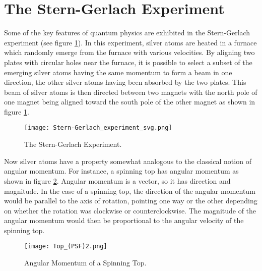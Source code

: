 \documentclass[letter, 12pt]{turabian-thesis}
\theoremstyle{hypothesis}
\begin{document}
\section{The Stern-Gerlach Experiment}
 Some of the key features of quantum physics are exhibited in the Stern-Gerlach experiment (see figure \ref{stern}).
In this experiment, silver atoms are heated in a furnace which randomly emerge from the furnace with various velocities. By aligning two plates with circular holes near the furnace, it is possible to select a subset of the emerging silver atoms having the same momentum to form a beam in one direction, the other silver atoms having been absorbed by the two plates. This beam of silver atoms is then directed between two magnets with the north pole of one magnet being aligned toward the south pole of the other magnet as shown in figure \ref{stern}.
\begin{figure}[ht!]
\captionsetup{justification=justified}
\centering
\texttt{[image: Stern-Gerlach\_experiment\_svg.png]}
\caption[Caption for LOF]{The Stern-Gerlach Experiment.\protect\footnotemark}
\label{stern}
\end{figure}
 Now silver atoms have a property somewhat analogous to the classical notion of angular momentum. For instance, a spinning top has angular momentum as shown in figure \ref{spintop}. Angular momentum is a vector, so it has direction and magnitude. In the case of a spinning top, the direction of the angular momentum would be parallel to the axis of rotation, pointing one way or the other depending on whether the rotation was clockwise or counterclockwise. The magnitude of the angular momentum would then be proportional to the angular velocity of the spinning top. 
\begin{figure}[ht!]
\captionsetup{justification=centering}
\centering
\texttt{[image: Top\_(PSF)2.png]}
\caption{Angular Momentum of a Spinning Top.\protect\footnotemark}
\label{spintop}
\end{figure}
\end{document}
